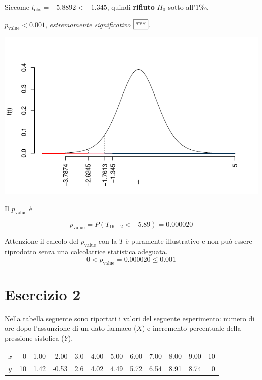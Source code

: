\documentclass[
  11pt,
]{book}
\theoremstyle{mytheoremstyle}
\theoremstyle{mydefstyle}
\newenvironment{sol}
  {
  \begin{tcolorbox}[enhanced,breakable,arc=0.1mm,boxrule=1pt,colback=white,colframe=iblue,
  title=\bf \fontfamily{lmss}\selectfont \hspace{.5 cm} Soluzione,drop fuzzy shadow]

}{
\end{tcolorbox}
  }
\begin{document}
\begin{sol}
Siccome \(t_\text{obs}=-5.8892<-1.345\), quindi \textbf{rifiuto} \(H_0\) sotto all'1‰,

\(p_\text{value}<0.001\), \emph{estremamente significativo} \(\fbox{***}\).

\begin{center}\includegraphics{Esami_passati_con_soluzioni_files/figure-latex/06-regr-8,-1} \end{center}

Il \(p_{\text{value}}\) è

\[ p_{\text{value}} = P(T_{16-2}<-5.89)=0.000020 \]

Attenzione il calcolo del \(p_\text{value}\) con la \(T\) è puramente illustrativo e non può essere riprodotto senza una calcolatrice statistica adeguata.\[
 0 < p_\text{value}= 0.000020 \leq 0.001 
\]

\end{sol}

\section{Esercizio 2}\label{esercizio-2-2}

Nella tabella seguente sono riportati i valori del seguente
esperimento: numero di ore dopo l'assunzione di un dato farmaco
(\(X\)) e incremento percentuale della pressione sistolica (\(Y\)).

\begin{table}[H]
\centering
\begin{tabular}{lrrrrrrrrrrr}
\toprule
$x$ & 0 & 1.00 & 2.00 & 3.0 & 4.00 & 5.00 & 6.00 & 7.00 & 8.00 & 9.00 & 10\\
$y$ & 10 & 1.42 & -0.53 & 2.6 & 4.02 & 4.49 & 5.72 & 6.54 & 8.91 & 8.74 & 0\\
\bottomrule
\end{tabular}
\end{table}
\end{document}
